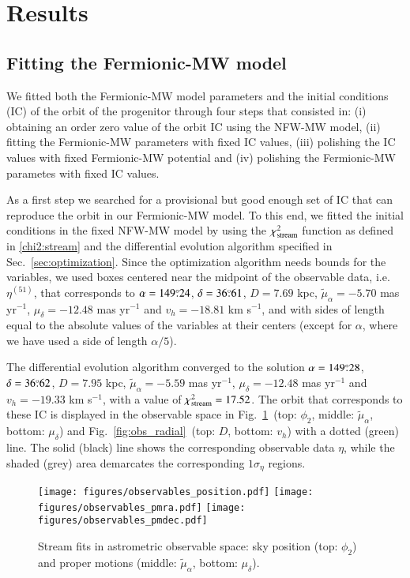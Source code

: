 \documentclass[twocolumn]{aa}
\begin{document}
\section{Results}
\label{sec:results}

\subsection{Fitting the Fermionic-MW model}
\label{sec:fitting}
We fitted both the Fermionic-MW model parameters and the initial conditions (IC) of the orbit of the progenitor through four steps that consisted in: (i) obtaining an order zero value of the orbit IC using the
NFW-MW model, (ii) fitting the Fermionic-MW parameters with fixed IC values, (iii) polishing the IC values with fixed Fermionic-MW potential and (iv) polishing the Fermionic-MW parametes with fixed IC values.

As a first step we searched for a provisional but good enough set of IC that can reproduce the orbit in our
Fermionic-MW model. To this end, we fitted the initial conditions in the fixed NFW-MW model by using the $\chi^2_{\rm{stream}}$ function as defined in \cref{chi2:stream}
and the differential evolution algorithm specified in Sec.~\ref{sec:optimization}. Since the optimization algorithm
needs bounds for the variables, we used boxes centered near the midpoint
of the observable data, i.e. $\eta^{(51)}$, that corresponds to $\alpha=149\overset{\circ}{.} 24$, $\delta=36\overset{\circ}{.} 61$, $D=7.69$ kpc, $\tilde{\mu}_\alpha=-5.70$ mas yr$^{-1}$, $\mu_\delta=-12.48$ mas yr$^{-1}$ and $v_h=-18.81$ km s$^{-1}$, and with sides of length equal to the absolute values of the variables at their centers (except for $\alpha$, where we have used a side of length $\alpha/5$).

The differential evolution algorithm converged to the solution 
$\alpha=149\overset{\circ}{.} 28$, $\delta=36\overset{\circ}{.} 62$, $D=7.95$ kpc, $\tilde{\mu}_\alpha=-5.59$ mas yr$^{-1}$, $\mu_\delta=-12.48$ mas yr$^{-1}$ and $v_h=-19.33$ km s$^{-1}$, with a value of $\chi^2_{\rm{stream}}= 17.52$.
The orbit that corresponds to these IC is displayed in the observable space in Fig.~\ref{fig:obs_astrometry}~(top: $\phi_2$, middle: $\tilde{\mu}_\alpha$, bottom: $\mu_\delta$) and Fig.~\ref{fig:obs_radial}~(top: $D$, bottom: $v_h$) with a dotted (green) line. The solid (black) line shows the corresponding observable data $\eta$, while the shaded (grey) area demarcates the corresponding $1\sigma_\eta$ regions.
\begin{figure}
   \centering
   \texttt{[image: figures/observables\_position.pdf]}
   \texttt{[image: figures/observables\_pmra.pdf]}
   \texttt{[image: figures/observables\_pmdec.pdf]}
   \caption{Stream fits in astrometric observable space: sky position (top: $\phi_2$) and proper motions (middle: $\tilde{\mu}_\alpha$, bottom: $\mu_\delta$).}
   \label{fig:obs_astrometry}
\end{figure}
\end{document}
